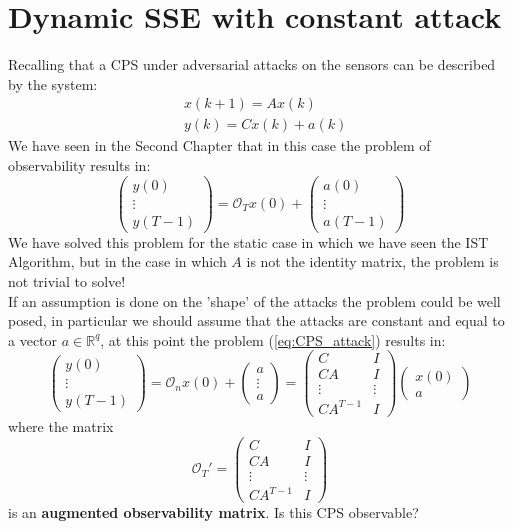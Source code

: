 \section{Dynamic SSE with constant attack}
Recalling that a CPS under adversarial attacks on the sensors can be described by the system: 
\begin{equation}
	\begin{aligned}
		&x(k+1)=Ax(k)\\
		&y(k)=Cx(k)+a(k)
	\end{aligned}
\end{equation}
We have seen in the Second Chapter that in this case the problem of observability results in:
\begin{equation} \label{eq:CPS_attack}
	\begin{pmatrix}
		y(0)\\ \vdots \\ y(T-1)
	\end{pmatrix}=\mathcal{O}_Tx(0)+\begin{pmatrix}
	a(0) \\ \vdots \\ a(T-1)
 	\end{pmatrix}
\end{equation}
We have solved this problem for the static case in which we have seen the IST Algorithm, but in the case in which $A$ is not the identity matrix, the problem is not trivial to solve!\\
If an assumption is done on the 'shape' of the attacks the problem could be well posed, in particular we should assume that the attacks are constant and equal to a vector $a\in\mathbb{R}^q$, at this point the problem (\ref{eq:CPS_attack}) results in:
\begin{equation} 
	\begin{pmatrix}
		y(0)\\ \vdots \\ y(T-1)
	\end{pmatrix}=\mathcal{O}_nx(0)+\begin{pmatrix}
		a \\ \vdots \\ a
	\end{pmatrix} = 
	\begin{pmatrix}
		C & I\\
		CA & I \\
		\vdots & \vdots\\
		CA^{T-1} & I	
	\end{pmatrix} \begin{pmatrix}
		x(0)\\a
	\end{pmatrix}
\end{equation}
where the matrix 
\begin{equation}	\label{eq:aug_matCPS}
	\mathcal{O}_T'=\begin{pmatrix}
		C & I\\
		CA & I \\
		\vdots & \vdots\\
		CA^{T-1} & I	
	\end{pmatrix}
\end{equation}
is an \textbf{augmented observability matrix}. Is this CPS observable?\\

